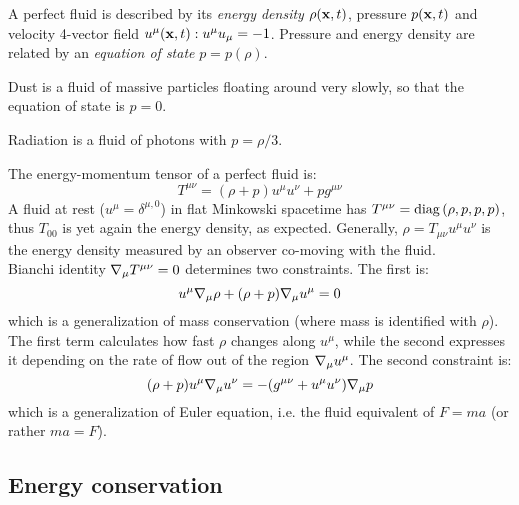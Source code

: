 A perfect fluid is described by its \textit{energy density} $ \rho(\mathbf{x},t) $, pressure $ p(\mathbf{x},t) $ and velocity 4-vector field $ u^\mu(\mathbf{x},t) : u^\mu u_\mu = -1 $. Pressure and energy density are related by an \textit{equation of state} $ p = p(\rho) $.

\begin{example}
  Dust is a fluid of massive particles floating around very slowly, so that the equation of state is $ p = 0 $.
\end{example}
\begin{example}
  Radiation is a fluid of photons with $ p = \rho / 3 $.
\end{example}

The energy-momentum tensor of a perfect fluid is:
\begin{equation}
  T^{\mu \nu} = (\rho + p) u^\mu u^\nu + p g^{\mu \nu}
  \label{eq:4.46}
\end{equation}
A fluid at rest ($ u^\mu = \delta^{\mu,0} $) in flat Minkowski spacetime has $ T^{\mu \nu} = \operatorname{diag} \left( \rho, p, p, p \right) $, thus $ T_{00} $ is yet again the energy density, as expected. Generally, $ \rho = T_{\mu \nu} u^\mu u^\nu $ is the energy density measured by an observer co-moving with the fluid.\\
Bianchi identity $ \nabla_\mu T^{\mu \nu} = 0 $ determines two constraints. The first is:
\begin{equation}
  u^\mu \nabla_\mu \rho + (\rho + p) \nabla_\mu u^\mu = 0
  \label{eq:4.47}
\end{equation}
which is a generalization of mass conservation (where mass is identified with $ \rho $). The first term calculates how fast $ \rho $ changes along $ u^\mu $, while the second expresses it depending on the rate of flow out of the region $ \nabla_\mu u^\mu $. The second constraint is:
\begin{equation}
  (\rho + p) u^\mu \nabla_\mu u^\nu = - (g^{\mu \nu} + u^\mu u^\nu) \nabla_\mu p
  \label{eq:4.48}
\end{equation}
which is a generalization of Euler equation, i.e. the fluid equivalent of $ F = ma $ (or rather $ ma = F $).

\subsection{Energy conservation}

